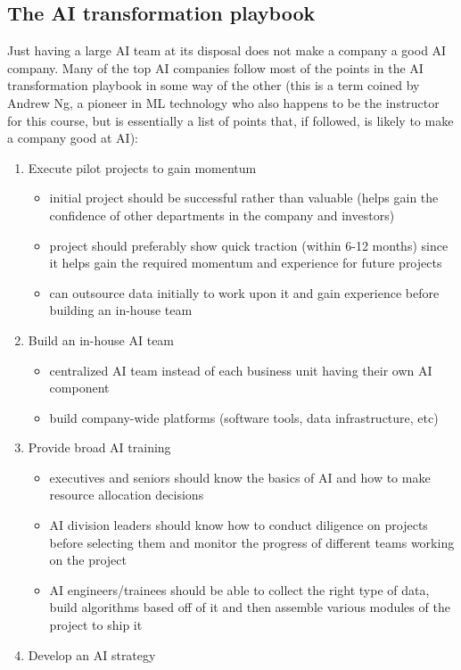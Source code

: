 \documentclass{article}[a4paper,12pt]
\theoremstyle{definition}
\begin{document}
\subsection{The AI transformation playbook}
Just having a large AI team at its disposal does not make a company a good AI company. Many of the top AI companies follow most of the points in the AI transformation playbook in some way of the other (this is a term coined by Andrew Ng, a pioneer in ML technology who also happens to be the instructor for this course, but is essentially a list of points that, if followed, is likely to make a company good at AI):
\begin{enumerate}
	\item Execute pilot projects to gain momentum
	\begin{itemize}
		\item initial project should be successful rather than valuable (helps gain the confidence of other departments in the company and investors)
		\item project should preferably show quick traction (within 6-12 months) since it helps gain the required momentum and experience for future projects
		\item can outsource data initially to work upon it and gain experience before building an in-house team
	\end{itemize}
	\item Build an in-house AI team
	\begin{itemize}
		\item centralized AI team instead of each business unit having their own AI component
		\item build company-wide platforms (software tools, data infrastructure, etc)
	\end{itemize}
	\item Provide broad AI training
	\begin{itemize}
		\item executives and seniors should know the basics of AI and how to make resource allocation decisions
		\item AI division leaders should know how to conduct diligence on projects before selecting them and monitor the progress of different teams working on the project
		\item AI engineers/trainees should be able to collect the right type of data, build algorithms based off of it and then assemble various modules of the project to ship it 
	\end{itemize}
	\item Develop an AI strategy

\end{enumerate}
\end{document}
